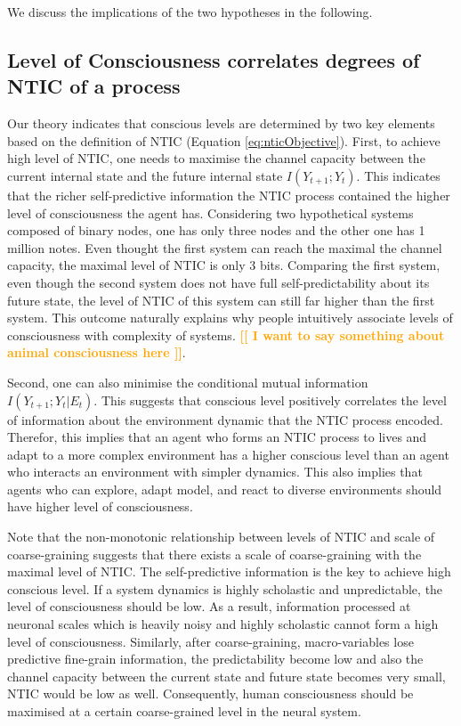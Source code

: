 \documentclass[utf8]{article}
\newcommand{\toWrite}[1]{\noindent
			\textcolor{Orange}{\textbf{[[ #1 ]]}}}
\begin{document}
		We discuss the implications of the two hypotheses in the following. 	
	    \subsection{Level of Consciousness correlates degrees of NTIC of a process}
	    
	    Our theory indicates that conscious levels are determined by two key elements based on the definition of NTIC (Equation \ref{eq:nticObjective}). First, to achieve high level of NTIC, one needs to maximise the channel capacity between the current internal state and the future internal state $I(Y_{t+1};Y_{t})$. This indicates that the richer self-predictive information the NTIC process contained the higher level of consciousness the agent has. Considering two hypothetical systems composed of binary nodes, one has only three nodes and the other one has 1 million notes. Even thought the first system can reach the maximal the channel capacity, the maximal level of NTIC is only 3 bits. Comparing the first system, even though the second system does not have full self-predictability about its future state, the level of NTIC of this system can still far higher than the first system. This outcome naturally explains why people intuitively associate levels of consciousness with complexity of systems. \toWrite{I want to say something about animal consciousness here}. 
	    
	    Second, one can also minimise the conditional mutual information  $I(Y_{t+1};Y_{t}|E_{t})$. This suggests that conscious level positively correlates the level of information about the environment dynamic that the NTIC process encoded. Therefor, this implies that an agent who forms an NTIC process to lives and adapt to a more complex environment has a higher conscious level than an agent who interacts an environment with simpler dynamics. This also implies that agents who can explore, adapt model, and react to diverse environments should have higher level of consciousness. 
	    
	    Note that the non-monotonic relationship between levels of NTIC and scale of coarse-graining suggests that there exists a scale of coarse-graining with the maximal level of NTIC. The self-predictive information is the key to achieve high conscious level. If a system dynamics is highly scholastic and unpredictable, the level of consciousness should be low. As a result, information processed at neuronal scales which is heavily noisy and highly scholastic cannot form a high level of consciousness. Similarly, after coarse-graining, macro-variables lose predictive fine-grain information, the predictability become low and also the channel capacity between the current state and future state becomes very small, NTIC would be low as well. Consequently, human consciousness should be maximised at a certain coarse-grained level in the neural system. 
	    
\end{document}
